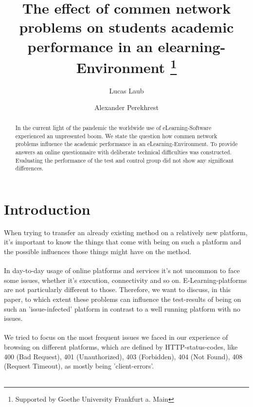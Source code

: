 \documentclass[runningheads]{llncs}
\begin{document}
\title{The effect of commen network problems on students academic performance in an elearning-Environment \thanks{Supported by Goethe University Frankfurt a. Main}}

\author{Lucas Laub \and
Alexander Perekhrest }


\maketitle


\begin{abstract}
In the current light of the pandemic the worldwide use
of eLearning-Software experienced an unpresented boom.
We state the question how commen network problems influence
the academic performance in an eLearning-Environment.
To provide answers an online questionnaire with deliberate
technical difficulties was constructed. Evaluating the performance
of the test and control group did not show any significant
differences.
\end{abstract}

\section{Introduction}
When trying to transfer an already existing method on a relatively new platform, 
it's important to know the things that come with being on such a platform and the 
possible influences those things might have on the method.\\\\

In day-to-day usage of online platforms and services it's not uncommon to face some 
issues, whether it's execution, connectivity and so on. E-Learning-platforms are not 
particularly different to those. Therefore, we want to discuss, in this paper, to 
which extent these problems can influence the test-results of being on such an 
'issue-infected' platform in contrast to a well running platform with no issues.\\\\

We tried to focus on the most frequent issues we faced in our experience of browsing 
on different platforms, which are defined by HTTP-status-codes, like 400 (Bad Request), 401 
(Unauthorized), 403 (Forbidden), 404 (Not Found), 408 (Request Timeout), as mostly being 'client-errors'.\\\\
\newpage
\end{document}
